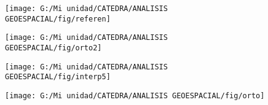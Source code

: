\documentclass[14pt]{beamer}
\begin{document}
\begin{frame}
\scriptsize{}
  \begin{figure}
    \centering
    \texttt{[image: G:/Mi unidad/CATEDRA/ANALISIS GEOESPACIAL/fig/referen]}
  \end{figure}
\end{frame}
\begin{frame}
  \begin{figure}
    \centering
    \qquad
    \label{fig:1}
  \end{figure}
  \begin{figure}
    \centering
    \qquad    
    \label{fig:2}
  \end{figure}
\end{frame}
\begin{frame}
\scriptsize{}
  \begin{figure}
    \centering
    \texttt{[image: G:/Mi unidad/CATEDRA/ANALISIS GEOESPACIAL/fig/orto2]}
  \end{figure}
\end{frame}
\begin{frame}
\scriptsize{}
  \begin{figure}
    \centering
    \texttt{[image: G:/Mi unidad/CATEDRA/ANALISIS GEOESPACIAL/fig/interp5]}
  \end{figure}
\end{frame}
\begin{frame}
\scriptsize{}
  \begin{figure}
    \centering
    \texttt{[image: G:/Mi unidad/CATEDRA/ANALISIS GEOESPACIAL/fig/orto]}
  \end{figure}
\end{frame}
\end{document}
